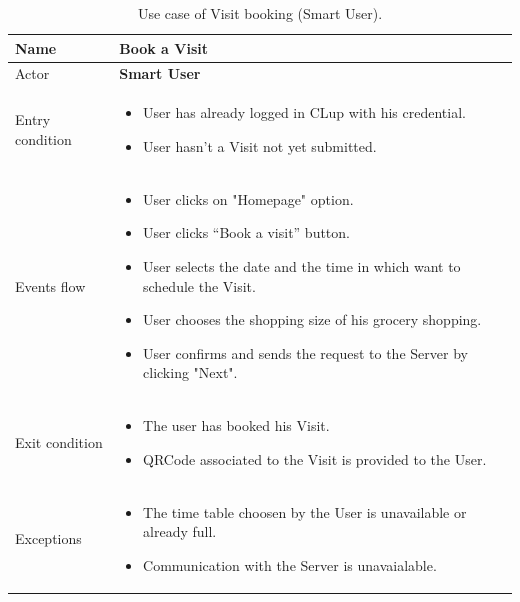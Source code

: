 \begin{table}[H]\begin{tabular}{|p{5cm} | p{7cm} | }
	\hline
	Name & \textbf{Book a Visit} \\
	\hline
	Actor & \textbf{Smart User} \\
	\hline
	Entry condition &
	\begin{itemize}
		\item User has already logged in CLup with his credential.  
		\item User hasn't a Visit not yet submitted. 
	\end{itemize} \\
	\hline
	Events flow & 
	\begin{itemize}
		\item User clicks on "Homepage" option.
		\item User clicks “Book a visit” button.
		\item User selects the date and the time in which want to schedule the Visit.
		\item User chooses the shopping size of his grocery shopping.
		\item User confirms and sends the request to the Server by clicking "Next". 
	\end{itemize} \\
	\hline
	Exit condition & 	
    \begin{itemize}
    \item The user has booked his Visit.
    \item QRCode associated to the Visit is provided to the User. 
    \end{itemize}
 \\
	\hline 
	Exceptions & \begin{itemize}
		\item The time table choosen by the User is unavailable or already full.
        \item Communication with the Server is unavaialable.
	\end{itemize}  \\ 
	\hline
\end{tabular}
\caption{Use case of Visit booking (Smart User).}
\end{table}

\bigbreak

